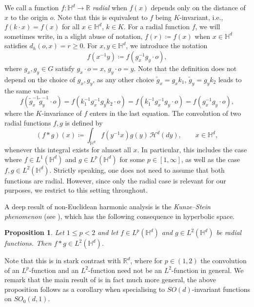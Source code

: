 \documentclass[11pt,a4paper]{article}
\theoremstyle{plain}
\newtheorem{proposition}[theorem]{Proposition}
\theoremstyle{definition}
\theoremstyle{remark}
\def\HH{\mathbb{H}}
\def\RR{\mathbb{R}}
\def\cH{\mathcal{H}}
\begin{document}
We call a function $f \colon \HH^d \to \RR$ \emph{radial} when $f(x)$ depends only on the distance of $x$ to the origin $o$.
Note that this is equivalent to $f$ being $K$-invariant, i.e., $f(k\cdot x) = f(x)$ for all $x \in \HH^d$, $k\in K$.
For a radial function $f$, we will sometimes write, in a slight abuse of notation,  $f(r) \coloneqq f(x)$ when $x\in\HH^d$ satisfies $d_h(o,x)=r\geq 0$.
For $x,y \in \HH^d$, we introduce the notation
\begin{equation}\label{eq:def_inverse}
    f(x^{-1}y) \coloneqq f(g_x^{-1}g_y \cdot o),
\end{equation}
where $g_x,g_y \in G$ satisfy $g_x \cdot o = x$, $g_y \cdot o = y$.
Note that the definition does not depend on the choice of $g_x,g_y$, as any other choice $\tilde g_x = g_x k_1$, $\tilde g_y = g_y k_2$ leads to the same value
\[ f(\tilde g_x^{-1} \tilde g_y^{-1} \cdot o) 
= f(k_1^{-1} g_x^{-1} g_y k_2 \cdot o) 
= f(k_1^{-1} g_x^{-1} g_y \cdot o)
= f(g_x^{-1} g_y \cdot o), \]
where the $K$-invariance of $f$ enters in the last equation.
The convolution of two radial functions $f,g$ is defined by
\[ (f*g )(x) \coloneqq \int_{\HH^d} f(y^{-1}x) g(y)\, \cH^{d}(dy), \qquad x \in \HH^d,\]
whenever this integral exists for almost all $x$.
In particular, this includes the case where $f \in L^1(\HH^d)$ and $g \in L^p(\HH^d)$ for some $p \in [1,\infty]$, as well as the case $f,g \in L^2(\HH^d)$. Strictly speaking, one does not need to assume that both functions are radial. However, since only the radial case is relevant for our purposes, we restrict to this setting throughout.

A deep result of non-Euclidean harmonic analysis is the \emph{Kunze--Stein phenomenon} (see \cite{Cowling78}), which has the following consequence in hyperbolic space.

\begin{proposition}\label{prop:kunze_stein}
    Let $1\leq p < 2$ and let $f \in L^p(\HH^d)$ and $g \in L^2(\HH^d)$ be radial functions.
    Then $f * g \in L^2(\HH^d)$.
\end{proposition}

Note that this is in stark contrast with $\RR^d$, where for $p \in (1,2)$ the convolution of an $L^p$-function and an $L^2$-function need not be an $L^2$-function in general.
We remark that the main result of \cite{Cowling78} is in fact much more general, the above proposition follows as a corollary when specialising to $SO(d)$-invariant functions on $SO_0(d,1)$.

\medspace
\end{document}
